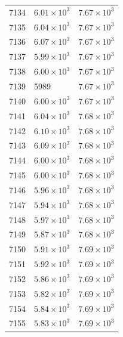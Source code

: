 \begin{table}[H]
\begin{tabular}{lll}
7134 & $\displaystyle 6.01 \times 10^{3}$ & $\displaystyle 7.67 \times 10^{3}$ \\
7135 & $\displaystyle 6.04 \times 10^{3}$ & $\displaystyle 7.67 \times 10^{3}$ \\
7136 & $\displaystyle 6.07 \times 10^{3}$ & $\displaystyle 7.67 \times 10^{3}$ \\
7137 & $\displaystyle 5.99 \times 10^{3}$ & $\displaystyle 7.67 \times 10^{3}$ \\
7138 & $\displaystyle 6.00 \times 10^{3}$ & $\displaystyle 7.67 \times 10^{3}$ \\
7139 & 5989 & $\displaystyle 7.67 \times 10^{3}$ \\
7140 & $\displaystyle 6.00 \times 10^{3}$ & $\displaystyle 7.67 \times 10^{3}$ \\
7141 & $\displaystyle 6.04 \times 10^{3}$ & $\displaystyle 7.68 \times 10^{3}$ \\
7142 & $\displaystyle 6.10 \times 10^{3}$ & $\displaystyle 7.68 \times 10^{3}$ \\
7143 & $\displaystyle 6.09 \times 10^{3}$ & $\displaystyle 7.68 \times 10^{3}$ \\
7144 & $\displaystyle 6.00 \times 10^{3}$ & $\displaystyle 7.68 \times 10^{3}$ \\
7145 & $\displaystyle 6.00 \times 10^{3}$ & $\displaystyle 7.68 \times 10^{3}$ \\
7146 & $\displaystyle 5.96 \times 10^{3}$ & $\displaystyle 7.68 \times 10^{3}$ \\
7147 & $\displaystyle 5.94 \times 10^{3}$ & $\displaystyle 7.68 \times 10^{3}$ \\
7148 & $\displaystyle 5.97 \times 10^{3}$ & $\displaystyle 7.68 \times 10^{3}$ \\
7149 & $\displaystyle 5.87 \times 10^{3}$ & $\displaystyle 7.68 \times 10^{3}$ \\
7150 & $\displaystyle 5.91 \times 10^{3}$ & $\displaystyle 7.69 \times 10^{3}$ \\
7151 & $\displaystyle 5.92 \times 10^{3}$ & $\displaystyle 7.69 \times 10^{3}$ \\
7152 & $\displaystyle 5.86 \times 10^{3}$ & $\displaystyle 7.69 \times 10^{3}$ \\
7153 & $\displaystyle 5.82 \times 10^{3}$ & $\displaystyle 7.69 \times 10^{3}$ \\
7154 & $\displaystyle 5.84 \times 10^{3}$ & $\displaystyle 7.69 \times 10^{3}$ \\
7155 & $\displaystyle 5.83 \times 10^{3}$ & $\displaystyle 7.69 \times 10^{3}$ \\

\end{tabular}
\end{table}
